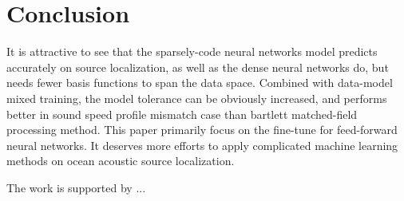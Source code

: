 \section{Conclusion}
It is attractive to see that the sparsely-code neural networks model predicts accurately on source localization,
as well as the dense neural networks do, but needs fewer basis functions to span the data space.
Combined with data-model mixed training, the model tolerance can be obviously increased,
and performs better in  sound speed profile mismatch case than bartlett matched-field processing method.
This paper primarily focus on the fine-tune for feed-forward neural networks.
It deserves more efforts to apply complicated machine learning methods on ocean
acoustic source localization.

\begin{acks}
The work is supported by ...

\end{acks}
